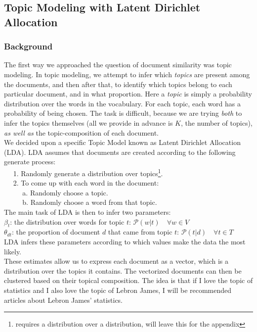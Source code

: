 \documentclass[11pt]{article}
\begin{document}
\subsection{Topic Modeling with Latent Dirichlet Allocation}
\subsubsection{Background}
The first way we approached the question of document similarity was topic modeling.  In topic modeling, we attempt to infer which \textit{topics} are present among the documents, and then after that, to identify which topics belong to each particular document, and in what proportion.  Here a \textit{topic} is simply a probability distribution over the words in the vocabulary.  For each topic, each word has a probability of being chosen.  The task is difficult, because we are trying \textit{both} to infer the topics themselves (all we provide in advance is $K$, the number of topics), \textit{as well as} the topic-composition of each document. \\

We decided upon a specific Topic Model known as Latent Dirichlet Allocation (LDA). LDA assumes that documents are created according to the following generate process: \\
$\text{} \quad$ 1. Randomly generate a distribution over topics\footnote{requires a distribution over a distribution, will leave this for the appendix}. \\
$\text{} \quad$ 2. To come up with each word in the document: \\
$\text{} \quad$ $\quad$ a. Randomly choose a topic. \\
$\text{} \quad$ $\quad$ b. Randomly choose a word from that topic.  \\

The main task of LDA is then to infer two parameters: \\
$\beta_t$: the distribution over words for topic $t$: $\mathcal{P}(w | t) \quad \forall w \in V$ \\
$\theta_{dt}$: the proportion of document $d$ that came from topic $t$: $\mathcal{P}(t | d) \quad \forall t \in T$ \\

LDA infers these parameters according to which values make the data the most likely. \\

These estimates allow us to express each document as a vector, which is a distribution over the topics it contains.  The vectorized documents can then be clustered based on their topical composition. The idea is that if I love the topic of statistics and I also love the topic of Lebron James, I will be recommended articles about Lebron James' statistics. 
\end{document}
